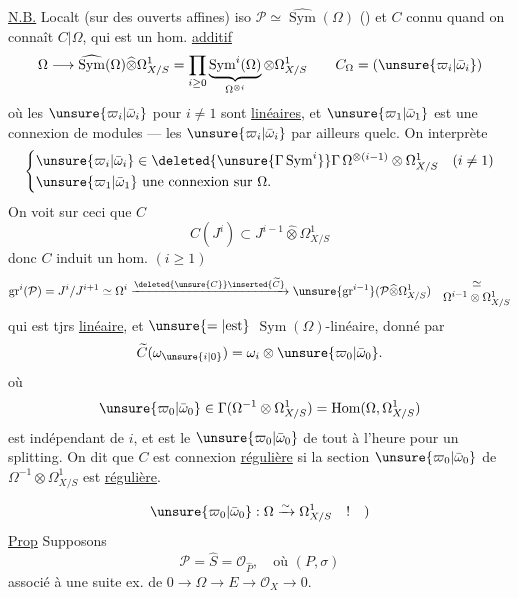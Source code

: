 \uline{N.B.} Localt (sur des ouverts affines) 
 iso $\mathcal P\simeq\widehat{\operatorname{Sym}}(\Omega)$ () et $C$ connu quand on connaît
$C|\Omega$, qui est un hom. \uline{additif}
\[
\Omega\longrightarrow\widehat{\operatorname{Sym}}(\Omega)\widehat\otimes\Omega^1_{X/S}
=\prod_{i\geq0}\underbrace{\operatorname{Sym}^i(\Omega)}_{\Omega^{\otimes i}}\otimes\Omega^1_{X/S}
\qquad C_\Omega=(\unsure{\varpi_i|\bar\omega_i})
\]
où les $\unsure{\varpi_i|\bar\omega_i}$ pour $i\neq1$ sont \uline{linéaires}, et
$\unsure{\varpi_1|\bar\omega_1}$ est une connexion de modules --- les $\unsure{\varpi_i|\bar\omega_i}$ par ailleurs quelc. On interprète
\[
\begin{cases}
\unsure{\varpi_i|\bar\omega_i}\in\deleted{\unsure{\Gamma\operatorname{Sym}^i}}\Gamma\,\Omega^{\otimes(i-1)}\otimes\Omega^1_{X/S}&(i\neq1)\\
\unsure{\varpi_1|\bar\omega_1}\text{ une connexion sur }\Omega.
\end{cases}
\]
On voit sur ceci que $C$ 
\[C(J^i)\subset J^{i-1}\widehat\otimes\Omega^1_{X/S}\]
donc $C$ induit un hom. $(i\geq1)$
\[
\operatorname{gr}^i(\mathcal P)=J^i/J^{i+1}\simeq\Omega^i
\xrightarrow{\deleted{\unsure{C}}\inserted{\widetilde C}}
\unsure{\operatorname{gr}^{i-1}}(\mathcal P\widehat\otimes\Omega^1_{X/S})
\quad\begin{matrix}\simeq\\\Omega^{i-1}\otimes\Omega^1_{X/S}\end{matrix}
\]
qui est tjrs \uline{linéaire}, et $\unsure{=|\text{est}}$
$\operatorname{Sym}(\Omega)$-linéaire, donné par
\[\widetilde C(\omega_{\unsure{i|0}})=\omega_i\otimes\unsure{\varpi_0|\bar\omega_0}.\]
où
\[\unsure{\varpi_0|\bar\omega_0}\in\Gamma(\Omega^{-1}\otimes\Omega^1_{X/S})=\operatorname{Hom}(\Omega,\Omega^1_{X/S})\]
est indépendant de $i$, et est le $\unsure{\varpi_0|\bar\omega_0}$ de tout à l'heure pour un splitting. On dit que $C$ est connexion \uline{régulière} si la section $\unsure{\varpi_0|\bar\omega_0}$ de $\Omega^{-1}\otimes\Omega^1_{X/S}$ est \uline{régulière}.

 
\[\unsure{\varpi_0|\bar\omega_0}:\Omega\xrightarrow{\sim}\Omega^1_{X/S}\quad!\quad)\]
\uline{Prop}  Supposons
\[\mathcal P=\widehat S=\mathcal O_{\widehat P},\quad\text{où }(P,\sigma)\]
associé à une suite ex. de $0\longrightarrow\Omega\longrightarrow E\longrightarrow\mathcal O_X\longrightarrow0$.

